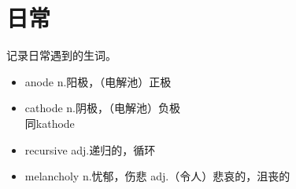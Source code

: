 \chapter{日常}
\begin{intro}
    \centering 记录日常遇到的生词。
\end{intro}

\begin{multicols*}{2}
    \begin{itemize}
        \item anode n.阳极，（电解池）正极
        \item cathode n.阴极，（电解池）负极\\同kathode
        \item recursive adj.递归的，循环
        \item melancholy n.忧郁，伤悲 adj.（令人）悲哀的，沮丧的
    \end{itemize}
\end{multicols*}
